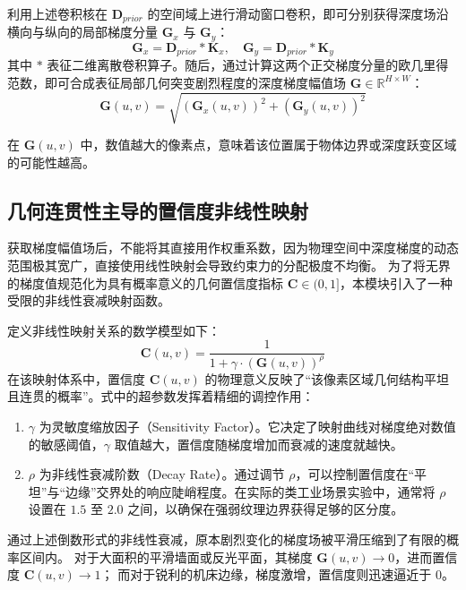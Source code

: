 利用上述卷积核在 $\bm{D}_{prior}$ 的空间域上进行滑动窗口卷积，即可分别获得深度场沿横向与纵向的局部梯度分量 $\bm{G}_x$ 与 $\bm{G}_y$：
\begin{equation}
    \bm{G}_x = \bm{D}_{prior} \ast \bm{K}_x, \quad \bm{G}_y = \bm{D}_{prior} \ast \bm{K}_y
\end{equation}
其中 $\ast$ 表征二维离散卷积算子。随后，通过计算这两个正交梯度分量的欧几里得范数，即可合成表征局部几何突变剧烈程度的深度梯度幅值场 $\bm{G} \in \mathbb{R}^{H \times W}$：
\begin{equation}
    \bm{G}(u,v) = \sqrt{\left(\bm{G}_x(u,v)\right)^2 + \left(\bm{G}_y(u,v)\right)^2}
    \label{eq:gradient_magnitude}
\end{equation}

在 $\bm{G}(u,v)$ 中，数值越大的像素点，意味着该位置属于物体边界或深度跃变区域的可能性越高。

\subsection{几何连贯性主导的置信度非线性映射}
\label{subsec:confidence_mapping}

获取梯度幅值场后，不能将其直接用作权重系数，因为物理空间中深度梯度的动态范围极其宽广，直接使用线性映射会导致约束力的分配极度不均衡。
为了将无界的梯度值规范化为具有概率意义的几何置信度指标 $\bm{C} \in (0, 1]$，本模块引入了一种受限的非线性衰减映射函数。

定义非线性映射关系的数学模型如下：
\begin{equation}
    \bm{C}(u,v) = \frac{1}{1 + \gamma \cdot \left( \bm{G}(u,v) \right)^\rho}
    \label{eq:confidence_map}
\end{equation}
在该映射体系中，置信度 $\bm{C}(u,v)$ 的物理意义反映了“该像素区域几何结构平坦且连贯的概率”。式中的超参数发挥着精细的调控作用：

\begin{enumerate}
    \item $\gamma$ 为灵敏度缩放因子（Sensitivity Factor）。它决定了映射曲线对梯度绝对数值的敏感阈值，$\gamma$ 取值越大，置信度随梯度增加而衰减的速度就越快。
    \item $\rho$ 为非线性衰减阶数（Decay Rate）。通过调节 $\rho$，可以控制置信度在“平坦”与“边缘”交界处的响应陡峭程度。在实际的类工业场景实验中，通常将 $\rho$ 设置在 $1.5$ 至 $2.0$ 之间，以确保在强弱纹理边界获得足够的区分度。
\end{enumerate}



通过上述倒数形式的非线性衰减，原本剧烈变化的梯度场被平滑压缩到了有限的概率区间内。
对于大面积的平滑墙面或反光平面，其梯度 $\bm{G}(u,v) \to 0$，进而置信度 $\bm{C}(u,v) \to 1$；
而对于锐利的机床边缘，梯度激增，置信度则迅速逼近于 $0$。

